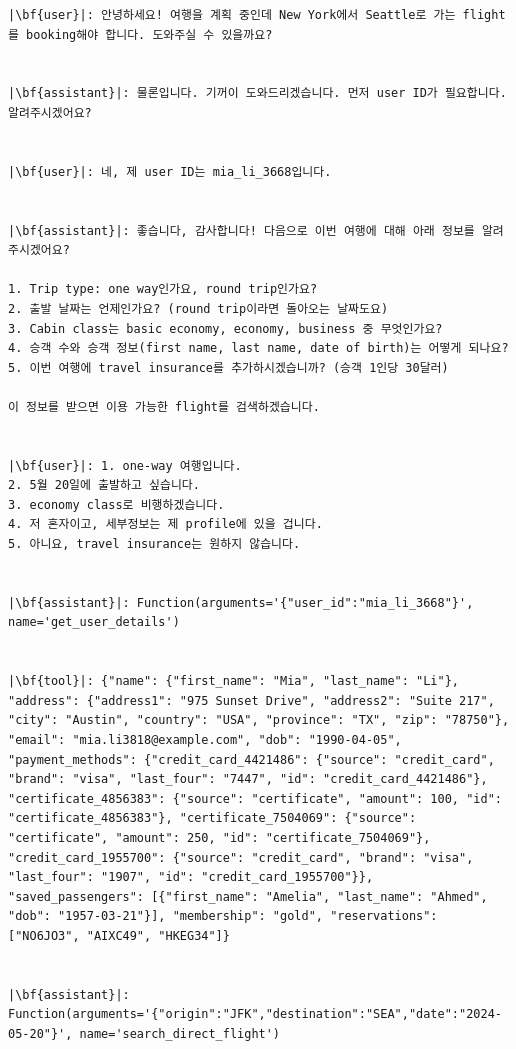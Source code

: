 \begin{verbatim}
|\bf{user}|: 안녕하세요! 여행을 계획 중인데 New York에서 Seattle로 가는 flight를 booking해야 합니다. 도와주실 수 있을까요?


|\bf{assistant}|: 물론입니다. 기꺼이 도와드리겠습니다. 먼저 user ID가 필요합니다. 알려주시겠어요?


|\bf{user}|: 네, 제 user ID는 mia_li_3668입니다.


|\bf{assistant}|: 좋습니다, 감사합니다! 다음으로 이번 여행에 대해 아래 정보를 알려주시겠어요?

1. Trip type: one way인가요, round trip인가요?
2. 출발 날짜는 언제인가요? (round trip이라면 돌아오는 날짜도요)
3. Cabin class는 basic economy, economy, business 중 무엇인가요?
4. 승객 수와 승객 정보(first name, last name, date of birth)는 어떻게 되나요?
5. 이번 여행에 travel insurance를 추가하시겠습니까? (승객 1인당 30달러)

이 정보를 받으면 이용 가능한 flight를 검색하겠습니다.


|\bf{user}|: 1. one-way 여행입니다.
2. 5월 20일에 출발하고 싶습니다.
3. economy class로 비행하겠습니다.
4. 저 혼자이고, 세부정보는 제 profile에 있을 겁니다.
5. 아니요, travel insurance는 원하지 않습니다.


|\bf{assistant}|: Function(arguments='{"user_id":"mia_li_3668"}', name='get_user_details')


|\bf{tool}|: {"name": {"first_name": "Mia", "last_name": "Li"}, "address": {"address1": "975 Sunset Drive", "address2": "Suite 217", "city": "Austin", "country": "USA", "province": "TX", "zip": "78750"}, "email": "mia.li3818@example.com", "dob": "1990-04-05", "payment_methods": {"credit_card_4421486": {"source": "credit_card", "brand": "visa", "last_four": "7447", "id": "credit_card_4421486"}, "certificate_4856383": {"source": "certificate", "amount": 100, "id": "certificate_4856383"}, "certificate_7504069": {"source": "certificate", "amount": 250, "id": "certificate_7504069"}, "credit_card_1955700": {"source": "credit_card", "brand": "visa", "last_four": "1907", "id": "credit_card_1955700"}}, "saved_passengers": [{"first_name": "Amelia", "last_name": "Ahmed", "dob": "1957-03-21"}], "membership": "gold", "reservations": ["NO6JO3", "AIXC49", "HKEG34"]}


|\bf{assistant}|: Function(arguments='{"origin":"JFK","destination":"SEA","date":"2024-05-20"}', name='search_direct_flight')



\end{verbatim}
